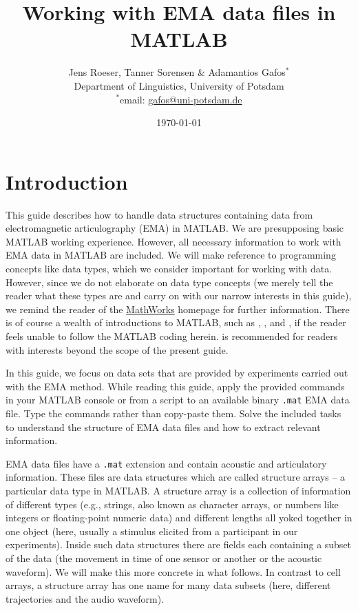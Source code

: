 \documentclass[a4paper, 12pt]{article}
\title{Working with EMA data files in MATLAB}
\date{\today}
\author{Jens Roeser, Tanner Sorensen \& Adamantios Gafos$^{*}$\vspace{0.5mm}\\
Department of Linguistics, University of Potsdam\\
$^{*}$email: \href{mailto:jens.roes@gmail.com}{
gafos@uni-potsdam.de}}
\begin{document}
\maketitle
\thispagestyle{empty}
\newpage


\section{Introduction}\label{sec:struc}

This guide describes how to handle data structures containing data from electromagnetic articulography (EMA) in MATLAB. We are presupposing basic MATLAB working experience. However, all necessary information to work with EMA data in MATLAB are included. We will make reference to programming concepts like data types, which we consider important for working with data. However, since we do not elaborate on data type concepts (we merely tell the reader what these types are and carry on with our narrow interests in this guide), we remind the reader of the \href{http://www.mathworks.de/de/help/matlab/structures.html}{MathWorks} homepage for further information. There is of course a wealth of introductions to MATLAB, such as  \cite{attaway2012}, \cite{gilant2011}, and \cite{rosenbaum2012}, if the reader feels unable to follow the MATLAB coding herein. \cite{quarteroni2010} is recommended for readers with interests beyond the scope of the present guide.

In this guide, we  focus on data sets that are provided by experiments carried out with the EMA method. While reading this guide, apply the provided commands in your MATLAB console or from a script to an available binary \texttt{.mat} EMA data file. Type the commands rather than copy-paste them. Solve the included tasks to understand the structure of EMA data files and how to extract relevant information.

EMA data files have a \texttt{.mat} extension and contain acoustic and articulatory information. These files are data structures which are called structure arrays -- a particular data type in MATLAB. A structure array is a collection of information of different types (e.g., strings, also known as character arrays, or numbers like integers or floating-point numeric data) and different lengths all yoked together in one object (here, usually a stimulus elicited from a participant in our experiments). Inside such data structures there are fields each containing a subset of the data (the movement in time of one sensor or another or the acoustic waveform). We will make this more concrete in what follows. In contrast to cell arrays, a structure array has one name for many data subsets (here, different trajectories and the audio waveform). 
\end{document}
